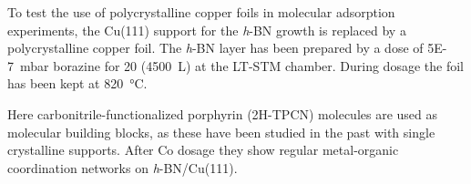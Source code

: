 To test the use of polycrystalline copper foils in molecular adsorption experiments, the Cu(111) support for the \textit{h}-BN growth is replaced by a polycrystalline copper foil. The \textit{h}-BN layer has been prepared by a dose of \SI{5E-7}{\milli\bar} borazine for \SI{20}{\min} (\SI{4500}{\L}) at the LT-STM chamber. During dosage the foil has been kept at \SI{820}{\celsius}. 

Here carbonitrile-functionalized porphyrin (2H-TPCN) molecules are used as molecular building blocks, as these have been studied in the past with single crystalline supports.\cite{urgel_controlling_2015} After Co dosage they show regular metal-organic coordination networks on \textit{h}-BN/Cu(111).
%  
%  
%  
%  
% 


